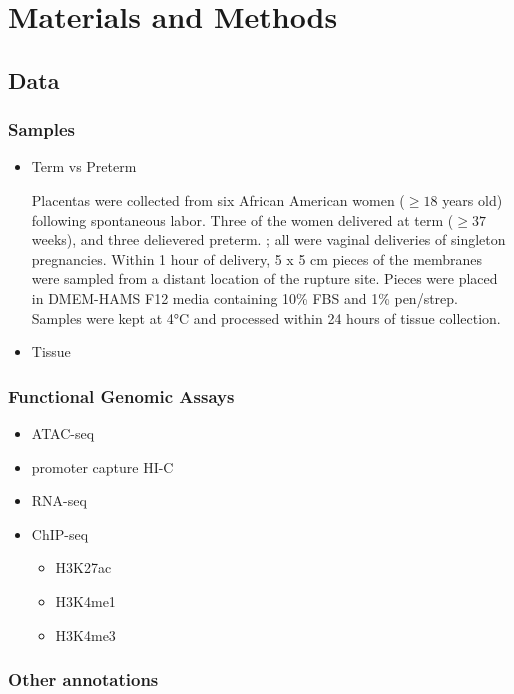 \section{Materials and Methods}\label{sec:org39326e2}

\subsection{Data}\label{sec:org702e301}
\subsubsection{Samples}\label{sec:orgbbced86}
\begin{itemize}
\item Term vs Preterm  \label{sec:org84e798f}
  
Placentas were collected from six African American women (\(\geq 18\) years old) following spontaneous labor.
Three of the women delivered at term (\(\geq 37\) weeks), and three delievered preterm.
; all were vaginal deliveries of singleton pregnancies. 
Within 1 hour of delivery, 5 x 5 cm pieces of the membranes were sampled from a distant location of the rupture site. 
Pieces were placed in DMEM-HAMS F12 media containing 10\% FBS and 1\% pen/strep.
 Samples were kept at 4°C and processed within 24 hours of tissue collection. 

\item Tissue\label{sec:org5ff2260}
\end{itemize}
\subsubsection{Functional Genomic Assays}\label{sec:org6fc5644}
\begin{itemize}
\item ATAC-seq
\item promoter capture HI-C
\item RNA-seq
\item ChIP-seq
\begin{itemize}
\item H3K27ac
\item H3K4me1
\item H3K4me3
\end{itemize}
\end{itemize}


\subsubsection{Other annotations}\label{sec:org4f58a59}


